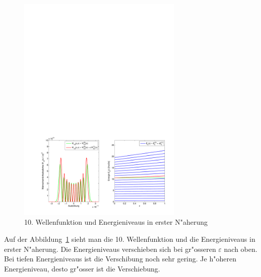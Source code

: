 \begin{refsection}
\begin{figure}[h]	%
\centering
\includegraphics[width=0.7\textwidth]{anharmonisch/images/x4/Stoerung1Wellenfunktion.pdf}
\caption{10. Wellenfunktion und Energieniveaus in erster N"aherung
\label{skript:x4_Stoerung1Wellenfunktion}}
\end{figure}

Auf der Abbildung~\ref{skript:x4_Stoerung1Wellenfunktion} sieht man die 10. Wellenfunktion und die Energieniveaus in erster N"aherung. Die Energieniveaus verschieben sich bei gr"osseren $\varepsilon$ nach oben. Bei tiefen Energieniveaus ist die Verschibung noch sehr gering. Je h"oheren Energieniveau, desto gr"osser ist die Verschiebung.


\end{refsection}

